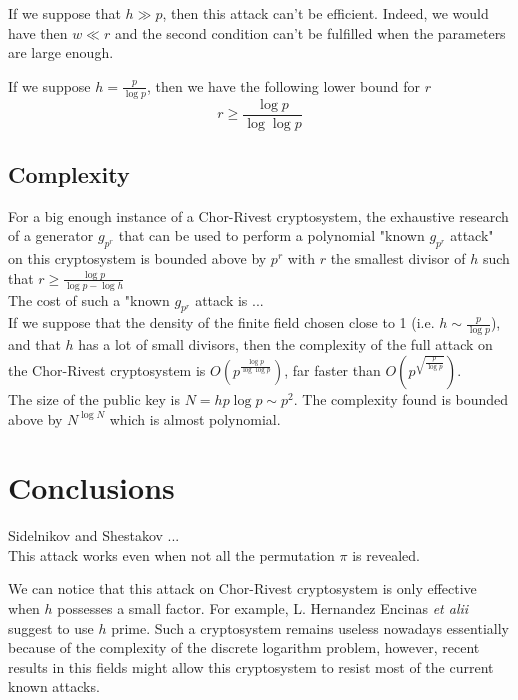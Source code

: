 \documentclass[a4paper]{article}
\begin{document}
If we suppose that $h \gg p$, then this attack can't be efficient. Indeed, we would have then $w \ll r$ and the second condition can't be fulfilled when the parameters are large enough.

If we suppose $h = \frac{p}{\log p}$, then we have the following lower bound for $r$
$$ r \geq \frac{\log p}{\log \log p}$$


\subsection{Complexity}


For a big enough instance of a Chor-Rivest cryptosystem, the exhaustive research of a generator $g_{p^r}$ that can be used to perform a polynomial "known $g_{p^r}$ attack" on this cryptosystem is bounded above by $p^r$ with $r$ the smallest divisor of $h$ such that $r \geq \frac{\log p}{\log p - \log h}$\\

The cost of such a "known $g_{p^r}$ attack is ...\\

If we suppose that the density of the finite field chosen close to 1 (i.e. $h \sim \frac{p}{\log p}$), and that $h$ has a lot of small divisors, then the complexity of the full attack on the Chor-Rivest cryptosystem is $O\left( p^{\frac{\log p}{\log \log p}} \right)$, far faster than $O\left(p^{\sqrt{\frac{p}{\log p}}}\right)$.\\

The size of the public key is $N = hp\log p \sim p^2$. The complexity found is bounded above by $N^{\log N}$ which is almost polynomial.




\section{Conclusions}

Sidelnikov and Shestakov ... \\



This attack works even when not all the permutation $\pi$ is revealed.

We can notice that this attack on Chor-Rivest cryptosystem is only effective when $h$ possesses a small factor. For example, L. Hernandez Encinas \textit{et alii} \cite{Enc04} suggest to use $h$ prime. Such a cryptosystem remains useless nowadays essentially because of the complexity of the discrete logarithm problem, however, recent results in this fields might allow this cryptosystem to resist most of the current known attacks.
\end{document}
